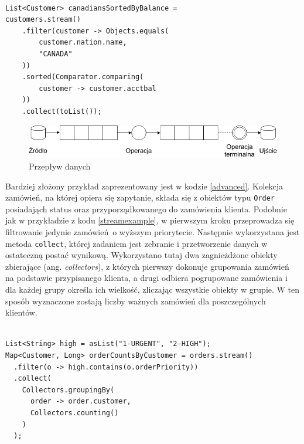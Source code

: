 \documentclass[12pt,twoside,openright]{extarticle}
\begin{document}
\begin{lstlisting}[label=streamexample, caption=Przykładowe wykorzystanie Stream API]

List<Customer> canadiansSortedByBalance = 
customers.stream()
    .filter(customer -> Objects.equals(
        customer.nation.name,
        "CANADA"
    ))
    .sorted(Comparator.comparing(
        customer -> customer.acctbal
    ))
    .collect(toList());

\end{lstlisting}

\begin{figure}
\centering
\includegraphics[width=14cm]{flow.png}
\caption{Przepływ danych}
\label{fig:flow}
\end{figure}

    Bardziej złożony przykład zaprezentowany jest w kodzie \ref{advanced}. Kolekcja zamówień, na której opiera się zapytanie, składa się z obiektów typu \texttt{Order} posiadająch status oraz przyporządkowanego do zamówienia klienta. Podobnie jak w przykładzie z kodu \ref{streamexample}, w pierwszym kroku przeprowadza się filtrowanie jedynie zamówień~o wyższym priorytecie. Następnie wykorzystana jest metoda \texttt{collect}, której zadaniem jest zebranie i przetworzenie danych w ostateczną postać wynikową. Wykorzystano tutaj dwa zagnieżdżone obiekty zbierające (ang. \textit{collectors}), z których pierwszy dokonuje grupowania zamówień na podstawie przypisanego klienta, a drugi odbiera pogrupowane zamówienia i dla każdej grupy określa ich wielkość, zliczając wszystkie obiekty w grupie. W ten sposób wyznaczone zostają liczby ważnych zamówień dla poszczególnych klientów.

\begin{lstlisting}[label=advanced, caption=Zaawansowane wykorzystanie Stream API]

List<String> high = asList("1-URGENT", "2-HIGH");
Map<Customer, Long> orderCountsByCustomer = orders.stream()
  .filter(o -> high.contains(o.orderPriority))
  .collect(
    Collectors.groupingBy(
      order -> order.customer,
      Collectors.counting()
    )
  );
  
    

\end{lstlisting}
\end{document}
